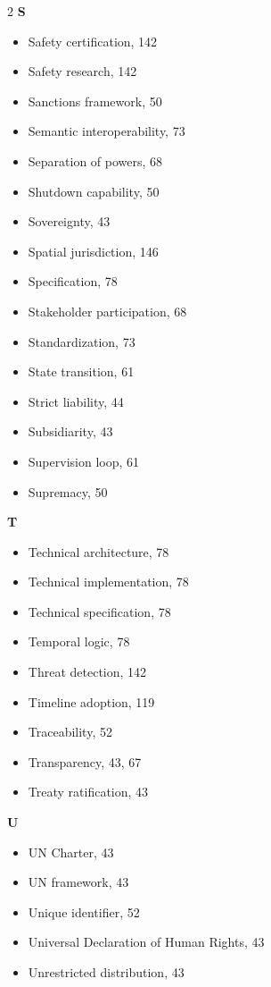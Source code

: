 \begin{multicols}{2}
\textbf{S}
\begin{itemize}[leftmargin=0.5cm]
\item Safety certification, 142
\item Safety research, 142
\item Sanctions framework, 50
\item Semantic interoperability, 73
\item Separation of powers, 68
\item Shutdown capability, 50
\item Sovereignty, 43
\item Spatial jurisdiction, 146
\item Specification, 78
\item Stakeholder participation, 68
\item Standardization, 73
\item State transition, 61
\item Strict liability, 44
\item Subsidiarity, 43
\item Supervision loop, 61
\item Supremacy, 50
\end{itemize}

\textbf{T}
\begin{itemize}[leftmargin=0.5cm]
\item Technical architecture, 78
\item Technical implementation, 78
\item Technical specification, 78
\item Temporal logic, 78
\item Threat detection, 142
\item Timeline adoption, 119
\item Traceability, 52
\item Transparency, 43, 67
\item Treaty ratification, 43
\end{itemize}

\textbf{U}
\begin{itemize}[leftmargin=0.5cm]
\item UN Charter, 43
\item UN framework, 43
\item Unique identifier, 52
\item Universal Declaration of Human Rights, 43
\item Unrestricted distribution, 43
\end{itemize}


\end{multicols}
